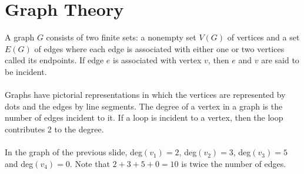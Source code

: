 \documentclass{report}
\begin{document}
\chapter{Graph Theory}
A graph $G$ consists of two finite sets: a nonempty set $V(G)$ of vertices and a set $E(G)$ of edges where each edge is associated with either one or two vertices called its endpoints. If edge $e$ is associated with vertex $v$, then $e$ and $v$ are said to be incident.
\\\\
Graphs have pictorial representations in which the vertices are represented by dots and the edges by line segments.
\noindent The degree of a vertex in a graph is the number of edges incident to it. If a loop is incident to a vertex, then the loop contributes 2 to the degree. 
\\\\
In the graph of the previous slide, deg$(v_{1})=2$, deg$(v_{2})=3$, deg$(v_{3})=5$ and deg$(v_{4})=0$. Note that $2+3+5+0=10$ is twice the number of edges.

\end{document}

